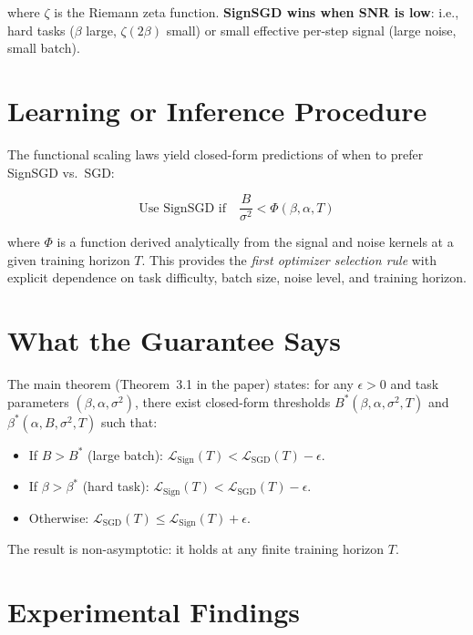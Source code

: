 \documentclass[10pt,twocolumn]{article}
\begin{document}
where $\zeta$ is the Riemann zeta function.
\textbf{SignSGD wins when SNR is low}: i.e., hard tasks ($\beta$ large, $\zeta(2\beta)$ small) or small effective per-step signal (large noise, small batch).

\section{Learning or Inference Procedure}

The functional scaling laws yield closed-form predictions of when to prefer SignSGD vs.\ SGD:

\begin{equation}
\text{Use SignSGD if} \quad \frac{B}{\sigma^2} < \Phi(\beta, \alpha, T)
\end{equation}

where $\Phi$ is a function derived analytically from the signal and noise kernels at a given training horizon $T$.
This provides the \emph{first optimizer selection rule} with explicit dependence on task difficulty, batch size, noise level, and training horizon.

\section{What the Guarantee Says}

The main theorem (Theorem~3.1 in the paper) states: for any $\epsilon > 0$ and task parameters $(\beta, \alpha, \sigma^2)$, there exist closed-form thresholds $B^*(\beta,\alpha,\sigma^2,T)$ and $\beta^*(\alpha,B,\sigma^2,T)$ such that:

\begin{itemize}[leftmargin=1em,itemsep=1pt]
  \item If $B > B^*$ (large batch): $\mathcal{L}_{\mathrm{Sign}}(T) < \mathcal{L}_{\mathrm{SGD}}(T) - \epsilon$.
  \item If $\beta > \beta^*$ (hard task): $\mathcal{L}_{\mathrm{Sign}}(T) < \mathcal{L}_{\mathrm{SGD}}(T) - \epsilon$.
  \item Otherwise: $\mathcal{L}_{\mathrm{SGD}}(T) \leq \mathcal{L}_{\mathrm{Sign}}(T) + \epsilon$.
\end{itemize}

The result is non-asymptotic: it holds at any finite training horizon $T$.

\section{Experimental Findings}
\end{document}

